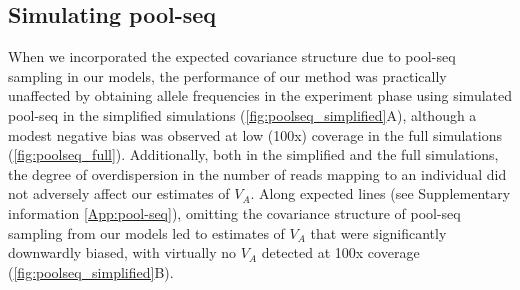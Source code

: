 \documentclass[12pt]{article}
\begin{document}
\begin{bibunit}
\subsection*{Simulating pool-seq}

When we incorporated the expected covariance structure due to pool-seq sampling in our models, the performance of our method was practically unaffected by obtaining allele frequencies in the experiment phase using simulated pool-seq in the simplified simulations (\ref{fig:poolseq_simplified}A), although a modest negative bias was observed at low (100x) coverage in the full simulations (\ref{fig:poolseq_full}). Additionally, both in the simplified and the full simulations, the degree of overdispersion in the number of reads mapping to an individual did not adversely affect our estimates of $V_A$. Along expected lines (see Supplementary information \ref{App:pool-seq}), omitting the covariance structure of pool-seq sampling from our models led to estimates of $V_A$ that were significantly downwardly biased, with virtually no $V_A$ detected at 100x coverage (\ref{fig:poolseq_simplified}B).   


\end{bibunit}
\end{document}
